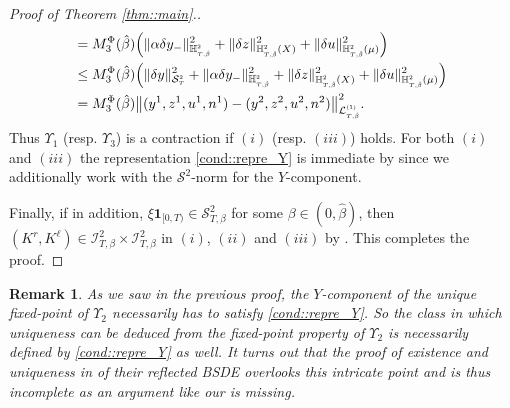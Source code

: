 \documentclass[10pt]{article} %
\newtheorem{remark}[theorem]{Remark}
\newcommand\cI{\mathcal I}
\newcommand\cL{\mathcal L}
\newcommand\cS{\mathcal S}
\newcommand{\smalltext}[1]{\text{\fontsize{4}{4}\selectfont$#1$}}
\def \H{\mathbb{H}}
\begin{document}
\begin{proof}[Proof of Theorem \ref{thm::main}.]
\begin{align*}
		&= M^\Phi_3(\hat\beta) \Big(\|\alpha\delta y_-\|^2_{\H^\smalltext{2}_{\smalltext{T}\smalltext{,}\smalltext{\hat\beta}}} + \|\delta z\|^2_{\H^\smalltext{2}_{\smalltext{T}\smalltext{,}\smalltext{\hat\beta}}(X)} + \|\delta u\|^2_{\H^\smalltext{2}_{\smalltext{T}\smalltext{,}\smalltext{\hat\beta}}(\mu)} \Big)  \nonumber\\
		&\leq M^\Phi_3(\hat\beta) \Big( \|\delta y\|^2_{\cS^\smalltext{2}_\smalltext{T}} + \|\alpha\delta y_-\|^2_{\H^\smalltext{2}_{\smalltext{T}\smalltext{,}\smalltext{\hat\beta}}} + \|\delta z\|^2_{\H^\smalltext{2}_{\smalltext{T}\smalltext{,}\smalltext{\hat\beta}}(X)} + \|\delta u\|^2_{\H^\smalltext{2}_{\smalltext{T}\smalltext{,}\smalltext{\hat\beta}}(\mu)} \Big)  \nonumber\\
		&= M^\Phi_3(\hat\beta)\big\|(y^1, z^1, u^1, n^1) - (y^2, z^2, u^2, n^2)\big\|^2_{\cL^\smalltext{(1)}_{\smalltext{T}\smalltext{,}\smalltext{\hat\beta}}}.
	\end{align*} 
	Thus $\Upsilon_1$ (resp. $\Upsilon_3$) is a contraction if $(i)$ (resp. $(iii)$) holds. For both $(i)$ and $(iii)$ the representation \ref{cond::repre_Y} is immediate by  since we additionally work with the $\cS^2$-norm for the $Y$-component.
	
	\medskip
	Finally, if in addition, $\xi\mathbf{1}_{[0,T)} \in \cS^2_{T,\beta}$ for some $\beta \in (0,\hat\beta)$, then $(K^r,K^\ell) \in \cI^2_{T,\beta} \times \cI^2_{T,\beta}$ in $(i)$, $(ii)$ and $(iii)$ by . This completes the proof.
\end{proof}


\begin{remark}\label{rem::missing_pieces}
	As we saw in the previous proof, the $Y$-component of the unique fixed-point of $\Upsilon_2$ necessarily has to satisfy \ref{cond::repre_Y}. So the class in which uniqueness can be deduced from the fixed-point property of $\Upsilon_2$ is necessarily defined by \ref{cond::repre_Y} as well. It turns out that the proof of existence and uniqueness in {\rm\cite{grigorova2020optimal}} of their reflected {\rm BSDE} overlooks this intricate point and is thus incomplete as an argument like our {\rm{}} is missing.
\end{remark}
\end{document}
